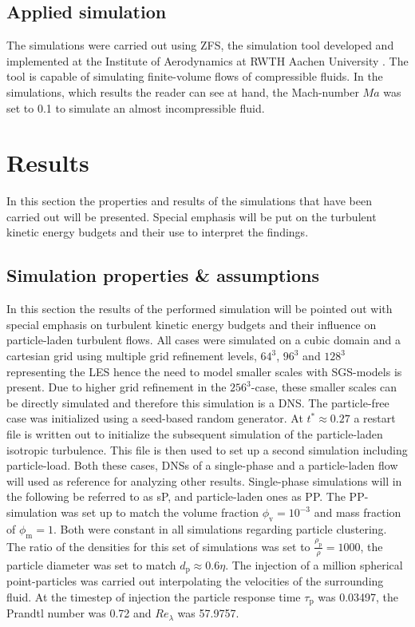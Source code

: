 \documentclass[11pt,a4paper,openany,oneside,parskip=half*]{article}
\begin{document}
\subsection{Applied simulation}
The simulations were carried out using ZFS, the simulation tool developed and implemented at the Institute of Aerodynamics at RWTH Aachen University 
\cite{anAdaptiveMultilevelMultigridFormulationForCartesianHierarchicalGridMethods} \cite{aStrictlyConservativeCartesianCutCellMethodForCompressibleViscousFlowsOnAdaptiveGrids}. 
The tool is capable of simulating finite-volume flows of compressible fluids. In the simulations, which results the reader can see at hand, the Mach-number $Ma$ was set to 0.1 to simulate an almost incompressible fluid.
\pagebreak
\section{Results}
In this section the properties and results of the simulations that have been carried out will be presented. Special emphasis will be put on the turbulent kinetic energy budgets and their use to interpret the findings.
\newline
\subsection{Simulation properties \& assumptions}
In this section the results of the performed simulation will be pointed out with special emphasis on turbulent kinetic energy budgets and their influence on particle-laden turbulent flows.
\newline
All cases were simulated on a cubic domain and a cartesian grid using multiple grid refinement levels, $64^3$, $96^3$ and $128^3$ representing the LES hence the need to model smaller scales with SGS-models is present. Due to higher grid refinement in the $256^3$-case, these smaller scales can be directly simulated and therefore this simulation is a DNS.
\newline
The particle-free case was initialized using a seed-based random generator. At $t^* \approx 0.27$ a restart file is written out to initialize the subsequent simulation of the particle-laden isotropic turbulence. This file is then used to set up a second simulation including particle-load. Both these cases, DNSs of a single-phase and a particle-laden flow will used as reference for analyzing other results. Single-phase simulations will in the following be referred to as sP, and particle-laden ones as PP. The PP-simulation was set up to match the volume fraction $\phi_\mathrm{v}= 10^{-3}$ and mass fraction of $\phi_\mathrm{m}=1$. Both were constant in all simulations regarding particle clustering. The ratio of the densities for this set of simulations was set to $\frac{\rho_\mathrm{p}}{\rho} = 1000$, the particle diameter was set to match $d_\mathrm{p} \approx 0.6 \eta$. The injection of a million spherical point-particles was carried out interpolating the velocities of the surrounding fluid. At the timestep of injection the particle response time $\tau_\mathrm{p}$ was 0.03497, the Prandtl number was 0.72 and $Re_\lambda$ was 57.9757. 
\newline
\end{document}

